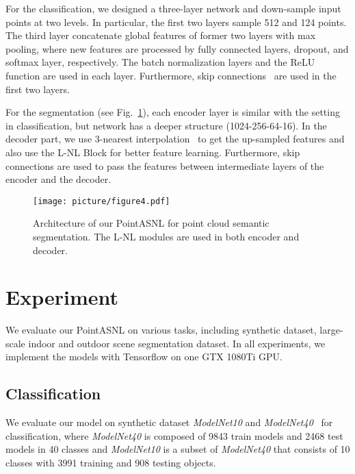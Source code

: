 \documentclass[10pt,twocolumn,letterpaper]{article}
\begin{document}
	For the {classification}, we designed a three-layer network and down-sample input points at two levels. In particular,  the first two layers sample 512 and 124 points. The third layer concatenate global features of former two layers with max pooling, where new features are processed by fully connected layers, dropout, and softmax layer, respectively. The batch normalization layers and the ReLU function are used in each layer. Furthermore, skip connections~\cite{resnet} are used in the first two layers.
	
	For the {segmentation} (see Fig.~\ref{fig:figure4}), each encoder layer is similar with the setting in classification, but network has a deeper structure (1024-256-64-16). In the decoder part, we use 3-nearest interpolation~\cite{pointnet2} to get the up-sampled features and also use the L-NL Block for better feature learning. Furthermore, skip connections are used to pass the features between intermediate layers of the encoder and the decoder.
	
	
	\begin{figure}[t]
		\begin{center}
			\texttt{[image: picture/figure4.pdf]}
		\end{center}
		\caption{{Architecture of our PointASNL for point cloud semantic segmentation.} The L-NL modules are used in both encoder and decoder.}
		\label{fig:figure4}
		\vspace{-0.3cm}
	\end{figure}
	
	


	\section{Experiment}
	\label{exp}
	
	We evaluate our PointASNL on various tasks, including synthetic dataset, large-scale indoor and outdoor scene segmentation dataset. In all experiments, we implement the models with Tensorflow on one GTX 1080Ti GPU. 
	
\subsection{Classification}
	We evaluate our model on synthetic dataset \textit{ModelNet10} and \textit{ModelNet40}~\cite{modelnet} for classification, where \textit {ModelNet40} is composed of 9843 train models and 2468 test models in 40 classes and  \textit {ModelNet10} is a subset of \textit{ModelNet40} that consists of 10 classes with 3991 training and 908 testing objects. 
\end{document}
